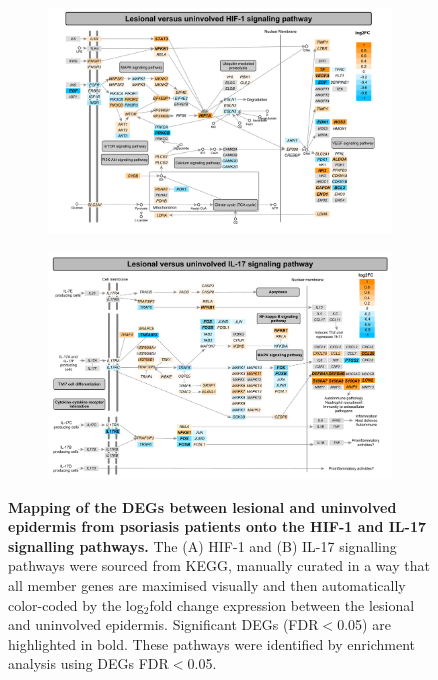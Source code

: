 \begin{figure}[htbp]
	\centering
	\begin{subfigure}{0.8\textwidth}
		\centering
		\includegraphics[width=\textwidth]{./Results2/pdfs/PS_lesional_uninvolved_all_HIF_1_pathway}
		\caption{\textbf{}}
	\end{subfigure}
	\begin{subfigure}{0.8 \textwidth}
		\centering
		\includegraphics[width=\textwidth]{./Results2/pdfs/PS_lesional_uninvolved_all_IL17_pathway}
		\caption{\textbf{}}
	\end{subfigure}
\caption[Mapping of the DEGs between lesional and uninvolved epidermis from psoriasis patients onto the HIF-1 and IL-17 signalling pathways.]{\textbf{Mapping of the DEGs between lesional and uninvolved epidermis from psoriasis patients onto the HIF-1 and IL-17 signalling pathways.} The (A) HIF-1 and (B) IL-17 signalling pathways were sourced from KEGG, manually curated in a way that all member genes are maximised visually and then automatically color-coded by the log$_2$fold change expression between the lesional and uninvolved epidermis. Significant DEGs (FDR$<$0.05) are highlighted in bold. These pathways were identified by enrichment analysis using DEGs FDR$<$0.05.}
\label{figure:PS_lesional_vs_uninvolved_HIF_IL17_pathway}
\end{figure}


